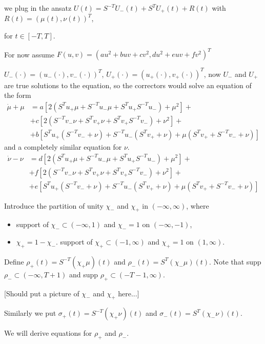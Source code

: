 \documentclass[letterpaper,11pt]{article}
\numberwithin{equation}{section}
\theoremstyle{plain}
\begin{document}
we plug in the ansatz
$U(t) = S^{-T}U_-(t)+S^TU_+(t)+R(t)$ with $R(t) = (\mu(t),\nu(t))^T$,

for $t \in [-T,T]$.

For now assume $F(u,v) = (au^2+buv+cv^2, du^2+euv+fv^2)^T$

$U_-(\cdot) = (u_-(\cdot),v_-(\cdot))^T$, $U_+(\cdot)=(u_+(\cdot),v_+(\cdot))^T$, now $U_-$ and $U_+$ are true solutions to the equation, so the correctors would solve an equation of the form
\begin{align*}
\dot{\mu} + \mu &=   a[2(S^Tu_+\mu+S^{-T}u_- \mu+S^Tu_+S^{-T}u_-)+\mu^2]+\\
&+c[2(S^{-T}v_-\nu+S^Tv_+\nu+S^Tv_+S^{-T}v_-)+\nu^2]+\\
&+b[S^Tu_+(S^{-T}v_-+\nu)+S^{-T}u_-(S^Tv_++\nu)+\mu(S^Tv_++S^{-T}v_-+\nu)]
\end{align*}
and a completely similar equation for $\nu$.
\begin{align*}
\dot{\nu} -\nu &= d[2(S^Tu_+\mu+S^{-T}u_- \mu+S^Tu_+S^{-T}u_-)+\mu^2]+\\
&+f[2(S^{-T}v_-\nu+S^Tv_+\nu+S^Tv_+S^{-T}v_-)+\nu^2]+\\
&+e[S^Tu_+(S^{-T}v_-+\nu)+S^{-T}u_-(S^Tv_++\nu)+\mu(S^Tv_++S^{-T}v_-+\nu)]
\end{align*}

Introduce the partition of unity $\chi_-$ and $\chi_+$ in $(-\infty, \infty)$, where  
\begin{itemize}

\item  support of $\chi_- \subset (-\infty,1)$ and $\chi_- = 1$ on $(-\infty,-1)$,
\item $\chi_+=1-\chi_-$. support of $\chi_+ \subset (-1,\infty)$ and $\chi_+ = 1$ on $(1,\infty)$.
\end{itemize}
Define $\rho_+(t) = S^{-T}(\chi_+\mu)(t)$ and
$\rho_-(t) = S^{T}(\chi_-\mu)(t)$. Note that supp $\rho_- \subset (-\infty, T+1)$ and supp $\rho_+ \subset (-T-1,\infty)$.

[Should put a picture of $\chi_-$ and $\chi_+$ here...]


Similarly we put $\sigma_+(t) = S^{-T}(\chi_+\nu)(t)$ and $\sigma_-(t) = S^{T}(\chi_-\nu)(t)$.

We will derive equations for $\rho_+$ and $\rho_-$.
\end{document}
